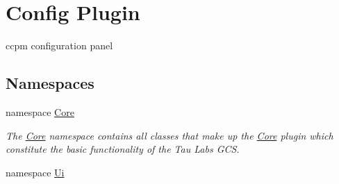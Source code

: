 \hypertarget{group___config_plugin}{\section{Config Plugin}
\label{group___config_plugin}
}


ccpm configuration panel  


\subsection*{Namespaces}
\begin{DoxyCompactItemize}
\item 
namespace \hyperlink{namespace_core}{Core}
\begin{DoxyCompactList}\small\item\em The \hyperlink{namespace_core}{Core} namespace contains all classes that make up the \hyperlink{namespace_core}{Core} plugin which constitute the basic functionality of the Tau Labs G\-C\-S. \end{DoxyCompactList}\item 
namespace \hyperlink{namespace_ui}{Ui}
\end{DoxyCompactItemize}
